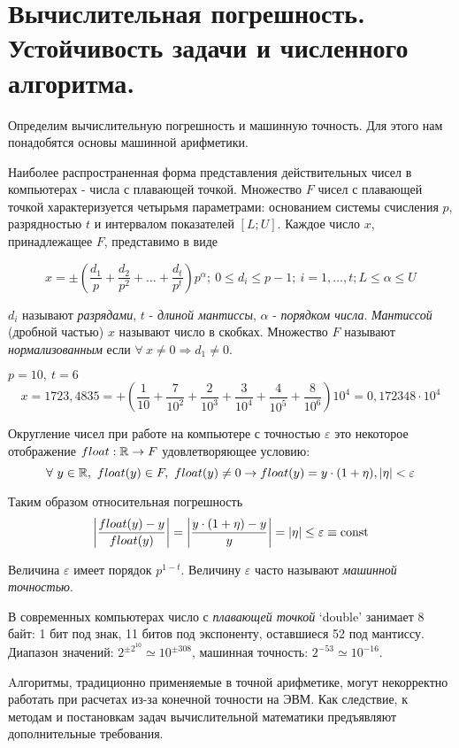 \section{Вычислительная погрешность. Устойчивость задачи и численного алгоритма.}

Определим вычислительную погрешность и машинную точность.
Для этого нам понадобятся основы машинной арифметики.

Наиболее распространенная форма представления действительных чисел в
компьютерах - числа с плавающей точкой. Множество $F$ чисел с плавающей
точкой характеризуется четырьмя параметрами: основанием системы
счисления $p$, разрядностью $t$ и интервалом показателей $[L;U]$. Каждое
число $x$, принадлежащее $F$, представимо в виде

\[x=\pm\left(\frac{d_1}{p}+\frac{d_2}{p^2}+\ldots+\frac{d_t}{p^t}\right)p^{\alpha};\ 0\leq d_i\leq p-1;\ i=1,\ldots,t;L\leq\alpha\leq U\]

$d_i$ называют \textit{разрядами}, $t$ - \textit{длиной мантиссы}, $\alpha$ - \textit{порядком числа}.
\textit{Мантиссой} (дробной частью) $x$ называют число в скобках.
Множество $F$ называют \textit{нормализованным} если $\forall\ x\neq0\Rightarrow d_1\neq0$.

\begin{example}
  $p=10,\ t=6$
  \[x = 1723,4835=+\left(\frac{1}{10}+\frac{7}{10^2}+\frac{2}{10^3}+\frac{3}{10^4}+\frac{4}{10^5}+\frac{8}{10^6}\right)10^4=0,172348\cdot10^4\]
\end{example}

Округление чисел при работе на компьютере с точностью $\varepsilon$ это
некоторое отображение $float:\mathbb{R} \rightarrow F$ удовлетворяющее условию:
\[\forall\ y\in\R,\ float(y)\in F,\ float(y)\neq0\rightarrow float(y)=y\cdot(1+\eta),|\eta|<\varepsilon\]

Таким образом относительная погрешность
\[\left|\frac{float(y)-y}{float(y)}\right|=\left|\frac{y\cdot(1+\eta)-y}{y}\right|=\left|\eta\right|\leq\varepsilon\equiv\mathrm{const}\]

Величина $\varepsilon$ имеет порядок $p^{1-t}$. Величину $\varepsilon$ часто называют \textit{машинной точностью}.

В современных компьютерах число с \textit{плавающей точкой}
`double' занимает 8 байт: 1 бит под знак, 11 битов под экспоненту,
оставшиеся 52 под мантиссу. Диапазон значений: $2^{\pm2^{10}}\simeq10^{\pm308}$,
машинная точность: $2^{-53}\simeq10^{-16}$.

Aлгоритмы, традиционно применяемые в точной арифметике,
могут некорректно работать при расчетах из-за конечной точности
на ЭВМ. Как следствие, к методам и постановкам задач вычислительной
математики предъявляют дополнительные требования.

